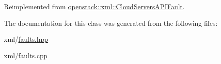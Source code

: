 Reimplemented from \hyperlink{classopenstack_1_1xml_1_1CloudServersAPIFault_a29ace5d37cf3fd9b457e2aa968079505}{openstack::xml::CloudServersAPIFault}.



The documentation for this class was generated from the following files:\begin{DoxyCompactItemize}
\item 
xml/\hyperlink{faults_8hpp}{faults.hpp}\item 
xml/faults.cpp\end{DoxyCompactItemize}
